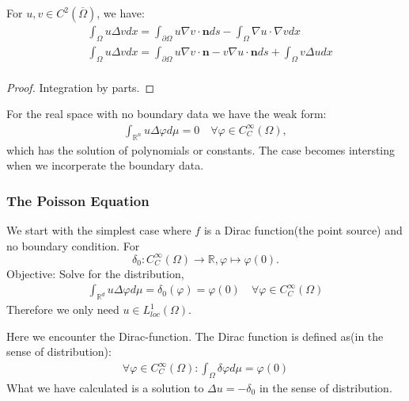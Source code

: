 \begin{lemma}
	For $u, v \in C^2(\overline{\Omega})$, we have:
	\begin{equation}
		\begin{aligned}
			& \int_\Omega u \Delta v dx = \int_{\partial \Omega} u  \nabla v \cdot   \mathbf{n}  ds - \int_\Omega \nabla u \cdot  \nabla v dx \\
			& \int_\Omega u \Delta v dx = \int_{\partial \Omega}
			u \nabla v \cdot \mathbf{n} - v \nabla u \cdot \mathbf{n} ds 
			+ \int_\Omega v \Delta u dx\\
		\end{aligned}
	\end{equation}
\end{lemma}
\begin{proof}
	Integration by parts.
\end{proof}

For the real space with no boundary data we have the weak form: 
\begin{align*}
	\int_{\mathbb{R}^n} u \Delta \varphi d\mu = 0 \quad \forall \varphi \in C^\infty_C(\Omega),
\end{align*} 
which has the solution of polynomials or constants. 
The case becomes intersting when we incorperate the boundary data. 

\subsubsection{The Poisson Equation}
We start with the simplest case where $f$ is a Dirac function(the point source) and no boundary condition.
For 
\begin{equation*}
\delta_0: C^\infty_C(\Omega) \rightarrow \mathbb{R}, \varphi \mapsto \varphi(0).
\end{equation*}
Objective: Solve for the distribution,
\begin{align}
	 \int_{\mathbb{R}^d} u \Delta \varphi d\mu = \delta_0(\varphi) = \varphi(0) \quad \forall \varphi \in C_C^\infty(\Omega)
\end{align}
Therefore we only need $u \in L^1_{loc}(\Omega)$. 

\begin{remark}
Here we encounter the Dirac-function. The Dirac function is defined as(in the sense of distribution):
\begin{align*}
	\forall \varphi \in C_C^\infty(\Omega): \int_\Omega \delta \varphi d\mu = \varphi(0)
\end{align*}	
What we have calculated is a solution to $\Delta u = -\delta_0$ in the sense of distribution.
\end{remark}

